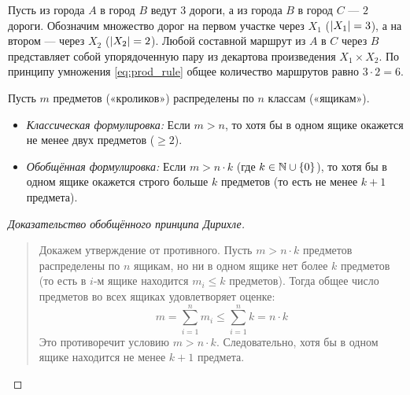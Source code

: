 \begin{example}
    Пусть из города $A$ в город $B$ ведут $3$ дороги, а из города $B$ в 
    город $C$ --- $2$ дороги. Обозначим множество дорог на первом участке 
    через $X_1$ ($\left| X_1 \right| = 3$), а на втором --- через $X_2$ 
    ($\left| X_2 \right| = 2$). Любой составной маршрут из $A$ в $C$ через $B$ 
    представляет собой упорядоченную пару из декартова произведения 
    $X_1 \times X_2$. По принципу умножения \eqref{eq:prod_rule} общее 
    количество маршрутов равно $3 \cdot 2 = 6$.
\end{example}

\begin{theorem}
    Пусть $m$ предметов («кроликов») распределены по $n$ классам 
    («ящикам»).
    \begin{itemize}
        \item \emph{Классическая формулировка:} Если $m > n$, то хотя бы в 
        одном ящике окажется не менее двух предметов ($\ge 2$).
        \item \emph{Обобщённая формулировка:} Если $m > n \cdot k$ 
        (где $k \in \mathbb{N} \cup \{0\}$), то хотя бы в одном ящике окажется 
        строго больше $k$ предметов (то есть не менее $k + 1$ предмета).
    \end{itemize}
\end{theorem}

\begin{proof}[Доказательство обобщённого принципа Дирихле]~\\
    \begin{quote}
        Докажем утверждение от противного. Пусть $m > n \cdot k$ предметов 
        распределены по $n$ ящикам, но ни в одном ящике нет более $k$ 
        предметов (то есть в $i$-м ящике находится $m_i \le k$ предметов). 
        Тогда общее число предметов во всех ящиках удовлетворяет оценке:
        \[
            m = \sum_{i=1}^n m_i \le \sum_{i=1}^n k = n \cdot k
        \]
        Это противоречит условию $m > n \cdot k$. Следовательно, хотя бы в 
        одном ящике находится не менее $k + 1$ предмета.
    \end{quote}
\end{proof}

